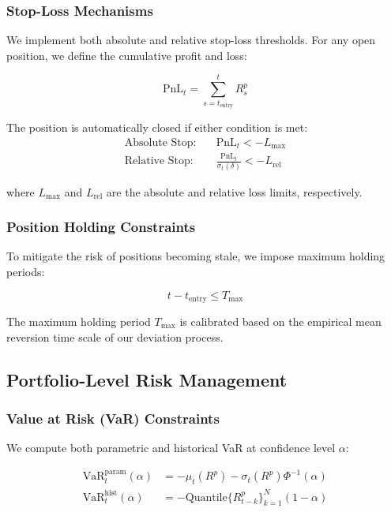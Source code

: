 \subsubsection{Stop-Loss Mechanisms}
We implement both absolute and relative stop-loss thresholds. For any open position, we define the cumulative profit and loss:

\begin{equation}
    \text{PnL}_t = \sum_{s=t_{\text{entry}}}^t R_s^p
\end{equation}

The position is automatically closed if either condition is met:
\begin{equation}
\begin{aligned}
    \text{Absolute Stop:} \quad & \text{PnL}_t < -L_{\text{max}} \\
    \text{Relative Stop:} \quad & \frac{\text{PnL}_t}{\sigma_t(\delta)} < -L_{\text{rel}}
\end{aligned}
\end{equation}

where $L_{\text{max}}$ and $L_{\text{rel}}$ are the absolute and relative loss limits, respectively.

\subsubsection{Position Holding Constraints}
To mitigate the risk of positions becoming stale, we impose maximum holding periods:

\begin{equation}
    t - t_{\text{entry}} \leq T_{\text{max}}
\end{equation}

The maximum holding period $T_{\text{max}}$ is calibrated based on the empirical mean reversion time scale of our deviation process.

\subsection{Portfolio-Level Risk Management}

\subsubsection{Value at Risk (VaR) Constraints}
We compute both parametric and historical VaR at confidence level $\alpha$:

\begin{equation}
\begin{aligned}
    \text{VaR}_t^{\text{param}}(\alpha) &= -\mu_t(R^p) - \sigma_t(R^p)\Phi^{-1}(\alpha) \\
    \text{VaR}_t^{\text{hist}}(\alpha) &= -\text{Quantile}\{R_{t-k}^p\}_{k=1}^N(1-\alpha)
\end{aligned}
\end{equation}

